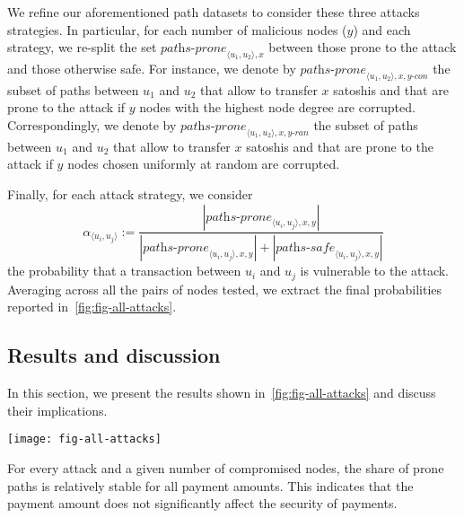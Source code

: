 We refine our aforementioned path datasets to consider these three attacks strategies.
In particular, for each number of malicious nodes ($y$) and each strategy, we re-split the set $\textit{paths-prone}_{\langle u_1, u_2 \rangle, x}$ 
between those prone to the attack and those otherwise safe. 
For instance, we denote by $\textit{paths-prone}_{\langle u_1, u_2 \rangle, x, y\textit{-con}}$ 
the subset of paths between 
$u_1$ and $u_2$ that allow to transfer $x$ satoshis and that are prone 
to the attack if $y$ nodes with the highest node degree are corrupted. 
Correspondingly, we denote by $\textit{paths-prone}_{\langle u_1, u_2 \rangle, x, y\textit{-ran}}$ 
the subset of paths between 
$u_1$ and $u_2$ that allow to transfer $x$ satoshis and that are prone 
to the attack if $y$ nodes chosen uniformly at random are corrupted. 

Finally, for each attack strategy, we consider $$\alpha_{\langle u_i, u_j \rangle} := \frac{|\textit{paths-prone}_{\langle u_i, u_j \rangle, x, y}|}{|\textit{paths-prone}_{\langle u_i, u_j \rangle, x, y}| + |\textit{paths-safe}_{\langle u_i, u_j \rangle, x, y}|}$$ 
the probability that a transaction between $u_i$ and $u_j$ is vulnerable to the attack. 
Averaging across all the pairs of nodes tested, we extract the final probabilities reported in~\cref{fig:fig-all-attacks}.


\subsection{Results and discussion}

In this section, we present the results shown in~\cref{fig:fig-all-attacks} and discuss their implications. 
\begin{figure*}
	\centering
	\texttt{[image: fig-all-attacks]}
	\caption{Share of vulnerable paths for each attack, considering that highest degree nodes are compromised (top), highest capacity nodes are compromised (middle), or random nodes are compromised (bottom).}
	\label{fig:fig-all-attacks}
\end{figure*}

For every attack and a given number of compromised nodes, the share of prone paths is relatively stable for all payment amounts.
This indicates that the payment amount does not significantly affect the security of payments.

